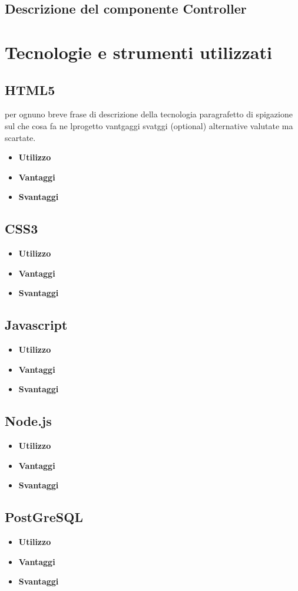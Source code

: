 \documentclass[a4paper,11pt]{article}
\begin{document}
	\subsection{Descrizione del componente Controller}
	\section{Tecnologie e strumenti utilizzati}
	\subsection{HTML5}
	per ognuno
	breve frase di descrizione della tecnologia
	paragrafetto di spigazione sul che cosa fa ne lprogetto
	vantgaggi
	svatggi
	(optional) alternative valutate ma scartate.
	\begin{itemize}
		\item\textbf{Utilizzo}
		\item\textbf{Vantaggi}
		\item\textbf{Svantaggi}
	\end{itemize}
	\subsection{CSS3}
	\begin{itemize}
		\item\textbf{Utilizzo}
		\item\textbf{Vantaggi}
		\item\textbf{Svantaggi}
	\end{itemize}
	\subsection{Javascript}
	\begin{itemize}
		\item\textbf{Utilizzo}
		\item\textbf{Vantaggi}
		\item\textbf{Svantaggi}
	\end{itemize}
	\subsection{Node.js}
	\begin{itemize}
		\item\textbf{Utilizzo}
		\item\textbf{Vantaggi}
		\item\textbf{Svantaggi}
	\end{itemize}
	\subsection{PostGreSQL}
	\begin{itemize}
		\item\textbf{Utilizzo}
		\item\textbf{Vantaggi}
		\item\textbf{Svantaggi}
	\end{itemize}
	
\end{document}
